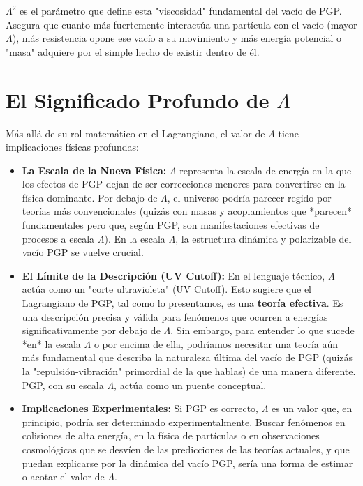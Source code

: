 \documentclass{article}
\newcommand{\LambdaSq}{\Lambda^2}
\begin{document}
$\LambdaSq$ es el parámetro que define esta "viscosidad" fundamental del vacío de PGP. Asegura que cuanto más fuertemente interactúa una partícula con el vacío (mayor $\Lambda$), más resistencia opone ese vacío a su movimiento y más energía potencial o "masa" adquiere por el simple hecho de existir dentro de él.

\section{El Significado Profundo de $\Lambda$}

Más allá de su rol matemático en el Lagrangiano, el valor de $\Lambda$ tiene implicaciones físicas profundas:

\begin{itemize}
    \item \textbf{La Escala de la Nueva Física:} $\Lambda$ representa la escala de energía en la que los efectos de PGP dejan de ser correcciones menores para convertirse en la física dominante. Por debajo de $\Lambda$, el universo podría parecer regido por teorías más convencionales (quizás con masas y acoplamientos que *parecen* fundamentales pero que, según PGP, son manifestaciones efectivas de procesos a escala $\Lambda$). En la escala $\Lambda$, la estructura dinámica y polarizable del vacío PGP se vuelve crucial.
    \item \textbf{El Límite de la Descripción (UV Cutoff):} En el lenguaje técnico, $\Lambda$ actúa como un "corte ultravioleta" (UV Cutoff). Esto sugiere que el Lagrangiano de PGP, tal como lo presentamos, es una \textbf{teoría efectiva}. Es una descripción precisa y válida para fenómenos que ocurren a energías significativamente por debajo de $\Lambda$. Sin embargo, para entender lo que sucede *en* la escala $\Lambda$ o por encima de ella, podríamos necesitar una teoría aún más fundamental que describa la naturaleza última del vacío de PGP (quizás la "repulsión-vibración" primordial de la que hablas) de una manera diferente. PGP, con su escala $\Lambda$, actúa como un puente conceptual.
    \item \textbf{Implicaciones Experimentales:} Si PGP es correcto, $\Lambda$ es un valor que, en principio, podría ser determinado experimentalmente. Buscar fenómenos en colisiones de alta energía, en la física de partículas o en observaciones cosmológicas que se desvíen de las predicciones de las teorías actuales, y que puedan explicarse por la dinámica del vacío PGP, sería una forma de estimar o acotar el valor de $\Lambda$.
\end{itemize}
\end{document}
